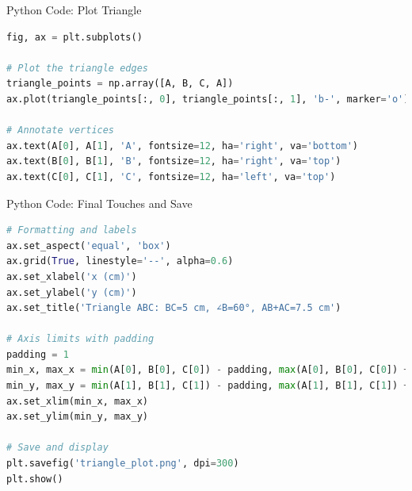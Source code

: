 \documentclass{beamer}
\begin{document}
\begin{frame}[fragile]{Python Code: Plot Triangle}
\begin{lstlisting}[language=Python]
fig, ax = plt.subplots()

# Plot the triangle edges
triangle_points = np.array([A, B, C, A])
ax.plot(triangle_points[:, 0], triangle_points[:, 1], 'b-', marker='o')

# Annotate vertices
ax.text(A[0], A[1], 'A', fontsize=12, ha='right', va='bottom')
ax.text(B[0], B[1], 'B', fontsize=12, ha='right', va='top')
ax.text(C[0], C[1], 'C', fontsize=12, ha='left', va='top')
\end{lstlisting}
\end{frame}

\begin{frame}[fragile]{Python Code: Final Touches and Save}
\begin{lstlisting}[language=Python]
# Formatting and labels
ax.set_aspect('equal', 'box')
ax.grid(True, linestyle='--', alpha=0.6)
ax.set_xlabel('x (cm)')
ax.set_ylabel('y (cm)')
ax.set_title('Triangle ABC: BC=5 cm, ∠B=60°, AB+AC=7.5 cm')

# Axis limits with padding
padding = 1
min_x, max_x = min(A[0], B[0], C[0]) - padding, max(A[0], B[0], C[0]) + padding
min_y, max_y = min(A[1], B[1], C[1]) - padding, max(A[1], B[1], C[1]) + padding
ax.set_xlim(min_x, max_x)
ax.set_ylim(min_y, max_y)

# Save and display
plt.savefig('triangle_plot.png', dpi=300)
plt.show()
\end{lstlisting}
\end{frame}
\end{document}
